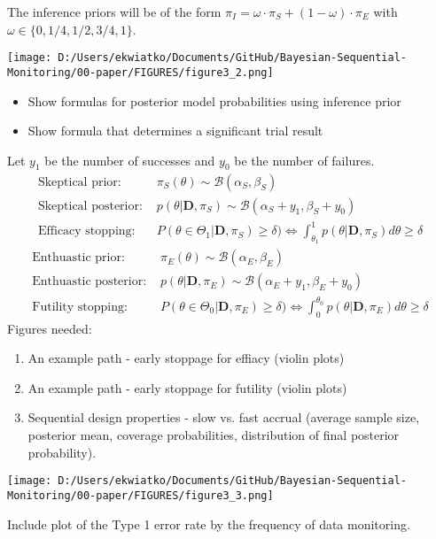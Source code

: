 \documentclass[12pt]{article}
\begin{document}
The inference priors will be of the form $\pi_{I}=\omega\cdot\pi_{S}+(1-\omega)\cdot\pi_E$ with $\omega\in\{0,1/4,1/2,3/4,1\}$.
\begin{center}
\texttt{[image: D:/Users/ekwiatko/Documents/GitHub/Bayesian-Sequential-Monitoring/00-paper/FIGURES/figure3\_2.png]}
\end{center}

\begin{itemize}
\item Show formulas for posterior model probabilities using inference prior
\item Show formula that determines a significant trial result
\end{itemize}
Let $y_1$ be the number of successes and $y_0$ be the number of failures.
\begin{align*}
\text{Skeptical prior: }&\pi_S(\theta)\sim\mathcal{B}(\alpha_S,\beta_S)\\
\text{Skeptical posterior: }&p(\theta|\mathbf{D},\pi_S)\sim\mathcal{B}(\alpha_S+y_1,\beta_S+y_0)\\
\text{Efficacy stopping: }&P(\theta\in\Theta_1|\mathbf{D}, \pi_{S})\geq\delta)\Longleftrightarrow\int_{\theta_1}^{1}p(\theta|\mathbf{D},\pi_S)d\theta\geq\delta
\end{align*}
\begin{align*}
\text{Enthuastic prior: }&\pi_E(\theta)\sim\mathcal{B}(\alpha_E,\beta_E)\\
\text{Enthuastic posterior: }&p(\theta|\mathbf{D},\pi_E)\sim\mathcal{B}(\alpha_E+y_1,\beta_E+y_0)\\
\text{Futility stopping: } &P(\theta\in\Theta_0|\mathbf{D}, \pi_{E})\geq\delta)\Longleftrightarrow\int_{0}^{\theta_0}p(\theta|\mathbf{D},\pi_E)d\theta\geq\delta
\end{align*}
Figures needed:
\begin{enumerate}
\item An example path - early stoppage for effiacy (violin plots)
\item An example path - early stoppage for futility (violin plots)
\item Sequential design properties - slow vs. fast accrual (average sample size, posterior mean, coverage probabilities, distribution of final posterior probability).
\end{enumerate}
\begin{center}
\texttt{[image: D:/Users/ekwiatko/Documents/GitHub/Bayesian-Sequential-Monitoring/00-paper/FIGURES/figure3\_3.png]}
\end{center}
Include plot of the Type 1 error rate by the frequency of data monitoring.
\end{document}
